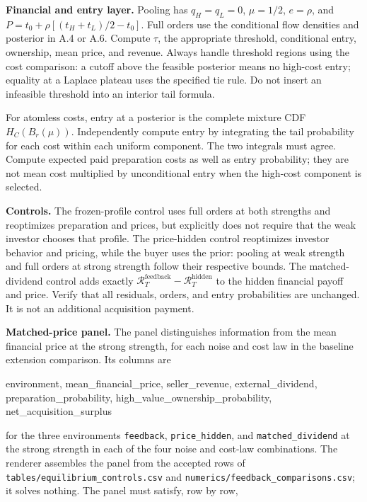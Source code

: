 \documentclass[
  11pt,
]{article}
\newenvironment{Shaded}{}{}
\newcommand{\NormalTok}[1]{#1}
\begin{document}
\textbf{Financial and entry layer.} Pooling has \(q_H=q_L=0\),
\(\mu=1/2\), \(e=\rho\), and \(P=t_0+\rho[(t_H+t_L)/2-t_0]\). Full
orders use the conditional flow densities and posterior in A.4 or A.6.
Compute \(\tau\), the appropriate threshold, conditional entry,
ownership, mean price, and revenue. Always handle threshold regions
using the cost comparison: a cutoff above the feasible posterior means
no high-cost entry; equality at a Laplace plateau uses the specified tie
rule. Do not insert an infeasible threshold into an interior tail
formula.

For atomless costs, entry at a posterior is the complete mixture CDF
\(H_C(B_r(\mu))\). Independently compute entry by integrating the tail
probability for each cost within each uniform component. The two
integrals must agree. Compute expected paid preparation costs as well as
entry probability; they are not mean cost multiplied by unconditional
entry when the high-cost component is selected.

\textbf{Controls.} The frozen-profile control uses full orders at both
strengths and reoptimizes preparation and prices, but explicitly does
not require that the weak investor chooses that profile. The
price-hidden control reoptimizes investor behavior and pricing, while
the buyer uses the prior: pooling at weak strength and full orders at
strong strength follow their respective bounds. The matched-dividend
control adds exactly
\(\mathcal R_T^{\mathrm{feedback}}-\mathcal R_T^{\mathrm{hidden}}\) to
the hidden financial payoff and price. Verify that all residuals,
orders, and entry probabilities are unchanged. It is not an additional
acquisition payment.

\textbf{Matched-price panel.} The panel distinguishes information from
the mean financial price at the strong strength, for each noise and cost
law in the baseline extension comparison. Its columns are

\begin{Shaded}
\begin{Highlighting}[]
\NormalTok{environment, mean\_financial\_price, seller\_revenue, external\_dividend,}
\NormalTok{preparation\_probability, high\_value\_ownership\_probability, net\_acquisition\_surplus}
\end{Highlighting}
\end{Shaded}

for the three environments \texttt{feedback}, \texttt{price\_hidden},
and \texttt{matched\_dividend} at the strong strength in each of the
four noise and cost-law combinations. The renderer assembles the panel
from the accepted rows of \texttt{tables/equilibrium\_controls.csv} and
\texttt{numerics/feedback\_comparisons.csv}; it solves nothing. The
panel must satisfy, row by row,
\end{document}
